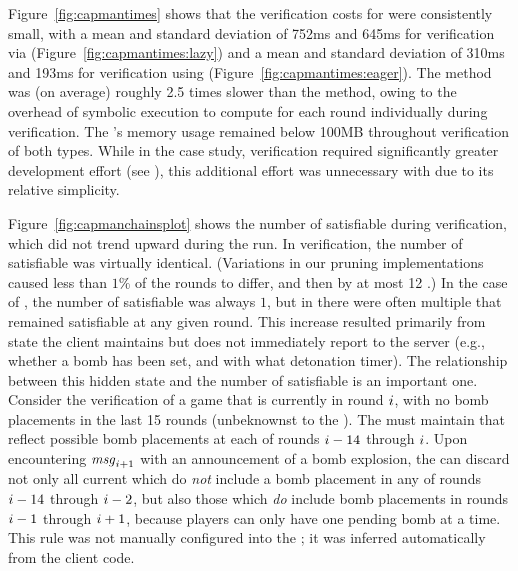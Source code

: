 Figure~\ref{fig:capmantimes} shows that the verification costs for
\capman were consistently small, with a mean and standard deviation of
752ms and 645ms for verification via \lazy \pathsegcons
(Figure~\ref{fig:capmantimes:lazy}) and a mean and standard deviation
of 310ms and 193ms for verification using \eager \pathsegcons
(Figure~\ref{fig:capmantimes:eager}).  The \lazy method was (on
average) roughly 2.5 times slower than the \eager method, owing to the
overhead of symbolic execution to compute \pathsegcons for each round
individually during verification.  The \verifier's memory usage
remained below 100MB throughout verification of both types.  While in
the \xpilot case study, \eager verification required significantly
greater development effort (see ),
this additional effort was unnecessary with \capman due to its
relative simplicity.

Figure~\ref{fig:capmanchainsplot} shows the number of satisfiable
\execpathcons during \eager verification, which did not trend upward
during the run.  In \lazy verification, the number of satisfiable
\execpathcons was virtually identical.  (Variations in our pruning
implementations caused less than $1\%$ of the rounds to differ, and
then by at most 12 \execpathcons.) In the case of \xpilot, the number
of satisfiable \execpathcons was always $1$, but in \capman there were
often multiple \execpathcons that remained satisfiable at any given
round.  This increase resulted primarily from state the \capman client
maintains but does not immediately report to the server (e.g., whether
a bomb has been set, and with what detonation timer).  The
relationship between this hidden state and the number of satisfiable
\execpathcons is an important one.  Consider the verification of a
\capman game that is currently in round $i$, with no bomb
placements in the last 15 rounds (unbeknownst to the \verifier).  The
\verifier must maintain \execpathcons that reflect possible bomb
placements at each of rounds $i-14$ through $i$.  Upon
encountering $\mathit{msg}_{i+1}$ with an announcement of a bomb
explosion, the \verifier can discard not only all current
\execpathcons which do {\em not} include a bomb placement in any of
rounds $i-14$ through $i-2$, but also those
\execpathcons which {\em do} include bomb placements in rounds
$i-1$ through $i+1$, because players can only have one
pending bomb at a time.  This rule was not manually configured into
the \verifier; it was inferred automatically from the client code.

